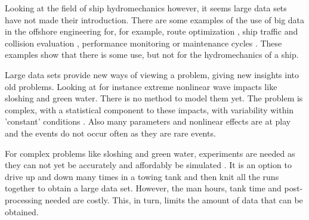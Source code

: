 \par 
Looking at the field of ship hydromechanics however, it seems large data sets have not made their introduction. There are some examples of the use of big data in the offshore engineering for, for example, route optimization \cite{Yan2018,Zhang2018}, ship traffic and collision evaluation \cite{Wang2020a,Kang2018, Zhang2021,Zhang2018,Zhang2019b}, performance monitoring \cite{Bui2021} or maintenance cycles \cite{Shaw2021}.  
These examples show that there is some use, but not for the hydromechanics of a ship. \par 
Large data sets provide new ways of viewing a problem, giving new insights into old problems.  
Looking at for instance extreme nonlinear wave impacts like sloshing and green water. There is no method to model them yet. The problem is complex, with a statistical component to these impacts, with variability within 'constant' conditions \cite{Bullock2007,Bogaert2010,Bredmose2009,Peregrine2003,Abdussamie2017}. Also many parameters and nonlinear effects are at play \cite{Greco2001,Buchner2002, Faltinsen2002} and the events do not occur often as they are rare events.
\par
For complex problems like sloshing and green water, experiments are needed as they can not yet be accurately and affordably be simulated \cite{Soares2005}. 
It is an option to drive up and down many times in a towing tank and then knit all the runs together to obtain a large data set. However, the man hours, tank time and post-processing needed are costly. This, in turn, limits the amount of data that can be obtained.\par

